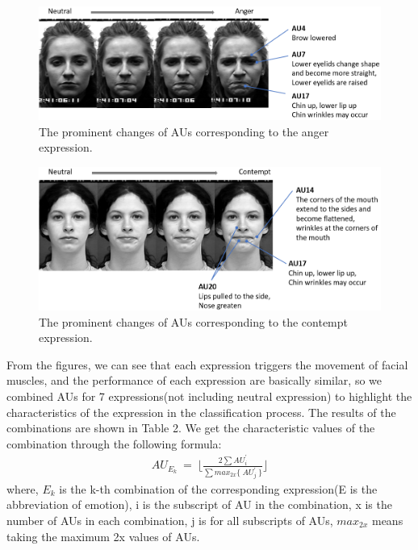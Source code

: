 \documentclass[10pt, conference, compsocconf]{IEEEtran}
\begin{document}
\begin{figure}[h]
	\centering
	\includegraphics[width=\linewidth]{AUexpression/anger}
	\caption{The prominent changes of AUs corresponding to the anger expression.}
\end{figure}
\begin{figure}[h]
	\centering
	\includegraphics[width=\linewidth]{AUexpression/contempt}
	\caption{The prominent changes of AUs corresponding to the contempt expression.}
\end{figure}

From the figures, we can see that each expression triggers the movement of facial muscles, and the performance of each expression are basically similar, so we combined AUs for 7 expressions(not including neutral expression) to highlight the characteristics of the expression in the classification process. The results of the combinations are shown in Table 2. We get the characteristic values of the combination through the following formula:
\begin{equation}\label{eqn:1}
\begin{split}
\displaystyle AU_{E_k}\ =\ \lfloor\frac{2\sum AU_i^{'}}{\sum max_{2x}\{\ AU_j^{'}\ \} }\rfloor
\end{split}
\end{equation}
where, $E_k$ is  the k-th combination of the corresponding expression(E is the abbreviation of emotion), i is the subscript of AU in the combination, x is the number of AUs in each combination, j is for all subscripts of AUs, $max_{2x}$ means taking the maximum 2x values of AUs.
\end{document}
